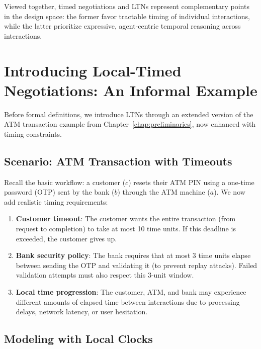 Viewed together, timed negotiations and LTNs represent complementary
points in the design space: the former favor tractable timing of
individual interactions, while the latter prioritize expressive,
agent-centric temporal reasoning across interactions.


\section{Introducing Local-Timed Negotiations: An Informal Example}
\label{sec:ltn-example-informal}

Before formal definitions, we introduce LTNs through an extended version of the ATM transaction example from Chapter~\ref{chap:preliminaries}, now enhanced with timing constraints.

\subsection{Scenario: ATM Transaction with Timeouts}

Recall the basic workflow: a customer ($c$) resets their ATM PIN using a one-time password (OTP) sent by the bank ($b$) through the ATM machine ($a$). We now add realistic timing requirements:

\begin{enumerate}
\item \textbf{Customer timeout}: The customer wants the entire transaction (from request to completion) to take at most 10 time units. If this deadline is exceeded, the customer gives up.

\item \textbf{Bank security policy}: The bank requires that at most 3 time units elapse between sending the OTP and validating it (to prevent replay attacks). Failed validation attempts must also respect this 3-unit window.

\item \textbf{Local time progression}: The customer, ATM, and bank may experience different amounts of elapsed time between interactions due to processing delays, network latency, or user hesitation.
\end{enumerate}

\subsection{Modeling with Local Clocks}

